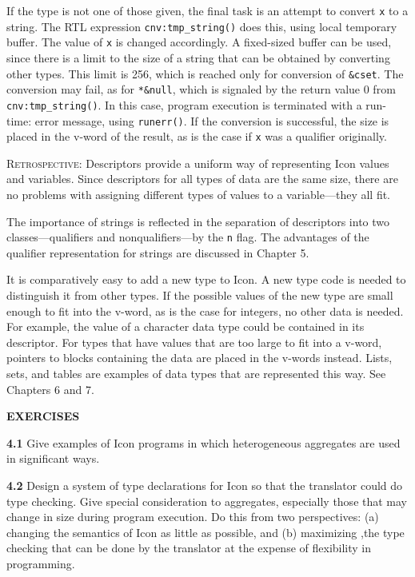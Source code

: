 If the type is not one of those given, the final task is an attempt to
convert \texttt{x} to a string. The RTL expression
\texttt{cnv:tmp\_string()} does this, using local temporary
buffer. The value of \texttt{x} is changed accordingly. A fixed-sized
buffer can be used, since there is a limit to the size of a string
that can be obtained by converting other types. This limit is 256,
which is reached only for conversion of \texttt{\&cset}. The
conversion may fail, as for \texttt{*\&null}, which is signaled by the
return value 0 from \texttt{cnv:tmp\_string()}. In this case, program
execution is terminated with a run-time: error message, using
\texttt{runerr()}. If the conversion is successful, the size is placed
in the v-word of the result, as is the case if \texttt{x} was a
qualifier originally.

\textsc{Retrospective}: Descriptors provide a uniform way of
representing Icon values and variables. Since descriptors for all
types of data are the same size, there are no problems with assigning
different types of values to a variable---they all fit.

The importance of strings is reflected in the separation of
descriptors into two classes---qualifiers and nonqualifiers---by the \texttt{n}
flag. The advantages of the qualifier representation for strings are
discussed in Chapter 5.

It is comparatively easy to add a new type to Icon. A new type code is
needed to distinguish it from other types. If the possible values of
the new type are small enough to fit into the v-word, as is the case
for integers, no other data is needed. For example, the value of a
character data type could be contained in its descriptor. For types
that have values that are too large to fit into a v-word, pointers to
blocks containing the data are placed in the v-words instead. Lists,
sets, and tables are examples of data types that are represented this
way. See Chapters 6 and 7.

\bigskip

\noindent\textbf{EXERCISES}

\noindent\textbf{4.1} Give examples of Icon programs in which
heterogeneous aggregates are used in significant ways.

\noindent\textbf{4.2} Design a system of type declarations for Icon so
that the translator could do type checking. Give special consideration
to aggregates, especially those that may change in size during program
execution. Do this from two perspectives: (a) changing the semantics
of Icon as little as possible, and (b) maximizing ,the type checking
that can be done by the translator at the expense of flexibility in
programming.

